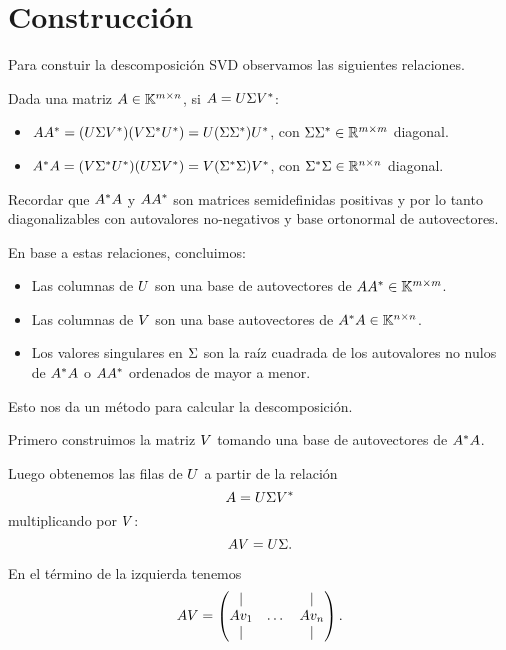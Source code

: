 \section{Construcción}

Para constuir la descomposición SVD observamos las siguientes relaciones.

Dada una matriz $\Ab \in \K^{m \times n}$, si $\Ab = \Ub \Sigmab \Vb^*$:

\begin{itemize}
\item $\Ab \Ab^* = (\Ub \Sigmab \Vb^*) (\Vb \Sigmab^* \Ub^*) = \Ub (\Sigmab \Sigmab^*) \Ub^*$, con $\Sigmab \Sigmab^* \in \R^{m \times m}$ diagonal.
\item $\Ab^* \Ab = (\Vb \Sigmab^* \Ub^*) (\Ub \Sigmab \Vb^*) = \Vb (\Sigmab^* \Sigmab) \Vb^*$, con $\Sigmab^* \Sigmab \in \R^{n \times n}$ diagonal.
\end{itemize}

Recordar que $\Ab^* \Ab$ y $\Ab \Ab^*$ son matrices semidefinidas positivas y por
lo tanto diagonalizables con autovalores no-negativos y base ortonormal
de autovectores.

En base a estas relaciones, concluimos:
\begin{itemize}
\item  Las columnas de $\Ub$ son una base de autovectores de
    $\Ab \Ab^* \in \K^{m \times m}$.

\item Las columnas de $\Vb$ son una base autovectores de
    $\Ab^* \Ab \in \K^{n \times n}$.

\item Los valores singulares en $\Sigmab$ son la raíz cuadrada de los
    autovalores no nulos de $\Ab^* \Ab$ o $\Ab \Ab^*$ ordenados de mayor a menor.
\end{itemize}


Esto nos da un método para calcular la descomposición.

Primero construimos la matriz $\Vb$ tomando una base de autovectores de $\Ab^* \Ab$.

Luego obtenemos las filas de $\Ub$ a partir de la relación
$$
\Ab = \Ub \Sigmab \Vb^*
$$
multiplicando por $\Vb$:
$$
\Ab \Vb = \Ub \Sigmab.
$$

En el término de la izquierda tenemos
$$
\Ab\Vb = \begin{pmatrix} \vert & & \vert \\ \Ab \vb_1 & \dots & \Ab \vb_n \\ \vert & & \vert \end{pmatrix}.
$$




